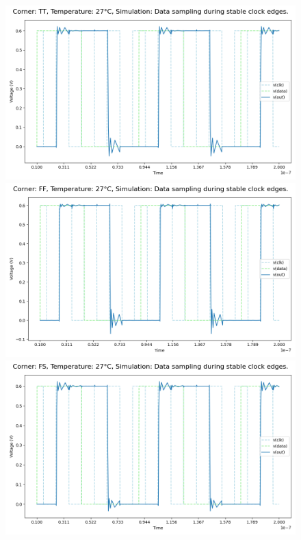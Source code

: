 \begin{figure}[H]
    \centering
    \includegraphics[height= 0.21\textheight]{figures/aimspice/0.600_0.1u_0.1u_0.3u_0.1u/functionality/TT27W2.png}
    \vspace{5pt}
    \includegraphics[height= 0.21\textheight]{figures/aimspice/0.600_0.1u_0.1u_0.3u_0.1u/functionality/FF27W2.png}
    \vspace{5pt}
    \includegraphics[height= 0.21\textheight]{figures/aimspice/0.600_0.1u_0.1u_0.3u_0.1u/functionality/FS27W2.png}

\end{figure}
